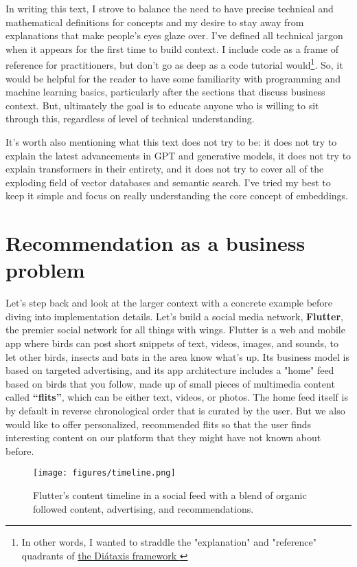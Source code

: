 \documentclass[11pt, table]{diazessay} %
\begin{document}
\begin{sloppypar}
In writing this text, I strove to balance the need to have precise technical and mathematical definitions for concepts and my desire to stay away from explanations that make people's eyes glaze over.  I've defined all technical jargon when it appears for the first time to build context. I include code as a frame of reference for practitioners, but don't go as deep as a code tutorial would\footnote{In other words, I wanted to straddle the "explanation" and "reference" quadrants of \href{https://diataxis.fr/}{the Diátaxis framework }}. So, it would be helpful for the reader to have some familiarity with programming and machine learning basics, particularly after the sections that discuss business context. But, ultimately the goal is to educate anyone who is willing to sit through this, regardless of level of technical understanding.

It's worth also mentioning what this text does not try to be: it does not try to explain the latest advancements in GPT and generative models, it does not try to explain transformers in their entirety, and it does not try to cover all of the exploding field of vector databases and semantic search. I've tried my best to keep it simple and focus on really understanding the core concept of embeddings.

\section{Recommendation as a business problem}

Let's step back and look at the larger context with a concrete example before diving into implementation details.  Let's build a social media network, \textbf{Flutter}, the premier social network for all things with wings. Flutter is a web and mobile app where birds can post short snippets of text, videos, images, and sounds, to let other birds, insects and bats in the area know what’s up. Its business model is based on targeted advertising, and its app architecture includes a "home" feed based on birds that you follow, made up of small pieces of multimedia content called \textbf{“flits”}, which can be either text, videos, or photos. The home feed itself is by default in reverse chronological order that is curated by the user. But we also would like to offer personalized, recommended flits so that the user finds interesting content on our platform that they might have not known about before.  

\begin{figure}[H]
\centering
\texttt{[image: figures/timeline.png]}
\caption{Flutter's content timeline in a social feed with a blend of organic followed content, advertising, and recommendations.}
\end{figure}


\end{sloppypar}
\end{document}
